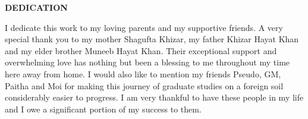 \thispagestyle{empty}

\begin{center}
\textbf{DEDICATION}
\end{center}

\smallskip

I dedicate this work to my loving parents and my supportive friends. A very special thank you to my 
mother Shagufta Khizar, my father Khizar Hayat Khan and my elder brother Muneeb Hayat Khan. 
Their exceptional support and overwhelming love has nothing but been a blessing to me throughout my time 
here away from home. I would also like to 
mention my friends Pseudo, GM, Paitha and Moi for making this journey of graduate studies on a 
foreign soil considerably easier to progress. I am very thankful to have these people in my life 
and I owe a significant portion of my success to them.



